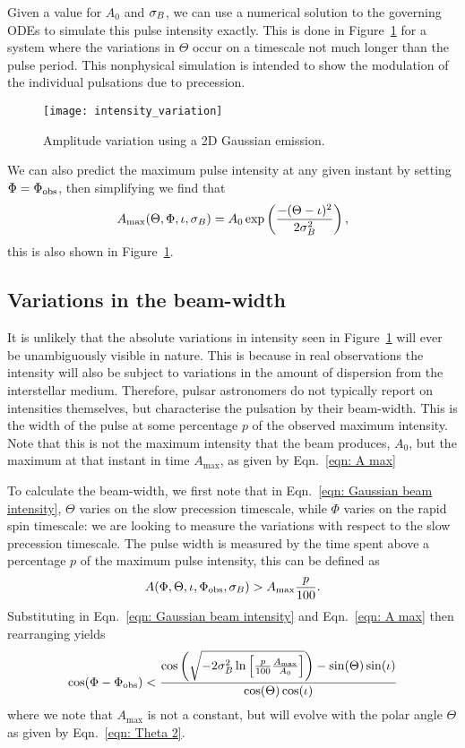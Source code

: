 \documentclass[../full_thesis/full_thesis.tex]{subfiles}
\begin{document}
Given a value for $A_0$ and $\sigma_{B}$, we can use a numerical solution to the
governing ODEs to simulate this pulse intensity exactly. This is done in
Figure~\ref{fig: intensity variation} for a system where the variations in
$\Theta$ occur on a timescale not much longer than the pulse period. This
nonphysical simulation is intended to show the modulation of the individual
pulsations due to precession.
\begin{figure}[htb]
\centering
\texttt{[image: intensity\_variation]}
\caption{Amplitude variation using a 2D Gaussian emission.}
\label{fig: intensity variation}
\end{figure}
We can also predict the maximum pulse intensity at any given instant by setting
$\Phi=\Phi_{\mathrm{obs}}$, then simplifying we find that
\begin{align}
A_{\mathrm{max}}(\Theta, \Phi, \iota, \sigma_{B}) =
A_{0}\exp\left(\frac{-(\Theta-\iota)^{2}}{2\sigma_{B}^{2}}\right),
\label{eqn: A max}
\end{align}
this is also shown in Figure~\ref{fig: intensity variation}.

\subsection{Variations in the beam-width}
\label{sec: numerical beam-width}
It is unlikely that the absolute variations in intensity seen in
Figure~\ref{fig: intensity variation} will ever be unambiguously visible in
nature. This is because in real observations the intensity will also be subject
to variations in the amount of dispersion from the interstellar medium.
Therefore, pulsar astronomers do not typically report on intensities
themselves, but characterise the pulsation by their beam-width. This is the
width of the pulse at some percentage $p$ of the observed maximum intensity.
Note that this is not the maximum intensity that the beam produces, $A_0$, but
the maximum at that instant in time $A_{\mathrm{max}}$, as given by
Eqn.~\eqref{eqn: A max}

To calculate the beam-width, we first note that in Eqn.~\eqref{eqn: Gaussian
beam intensity}, $\Theta$ varies on the slow precession timescale, while $\Phi$
varies on the rapid spin timescale: we are looking to measure the variations
with respect to the slow precession timescale.  The pulse width is measured by
the time spent above a percentage $p$ of the maximum pulse intensity, this can
be defined as
\begin{align}
A(\Phi, \Theta, \iota, \Phi_{\mathrm{obs}}, \sigma_{B}) > A_{\textrm{max}} \frac{p}{100}.
\end{align}
Substituting in Eqn.~\eqref{eqn: Gaussian beam intensity} and Eqn.~\eqref{eqn: A max}
then rearranging yields
\begin{equation}
\cos(\Phi - \Phi_{\mathrm{obs}}) < \frac{
\cos\left(
\sqrt{-2\sigma_{B}^{2}
\ln\left[\frac{p}{100}\frac{A_\textrm{max}}{A_0}\right]}\right) -
\sin(\Theta)\sin(\iota)} {\cos(\Theta)\cos(\iota)}
\label{eqn: 6737}
\end{equation}
where we note that $A_\textrm{max}$ is not a constant, but will evolve with the
polar angle $\Theta$ as given by Eqn.~\eqref{eqn: Theta 2}.
\end{document}
